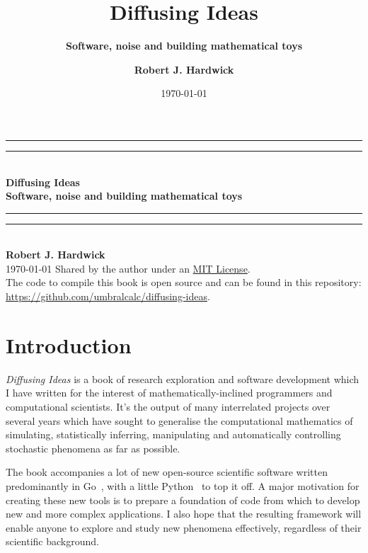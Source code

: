 \documentclass{book}
\title{\Huge \bfseries\sffamily Diffusing Ideas}
\subtitle{\Large \bfseries\sffamily \color{gray75} Software, noise and building mathematical toys}
\author{\bfseries\sffamily Robert J. Hardwick}
\date{\today}
\begin{document}
\begin{titlepage}
\centering
\vspace*{1.5\baselineskip}
{\color{gray75}\rule{13cm}{1.6pt}}\vspace*{-\baselineskip}\vspace*{2pt} %
{\color{gray75}\rule{13cm}{0.4pt}} \\ %
\vspace{1.0\baselineskip} %
{\Huge \bfseries\sffamily Diffusing Ideas} \\ 
\vspace{4mm}
{\Large \bfseries\sffamily \color{gray75} Software, noise and building mathematical toys \\}
\vspace{0.75\baselineskip}
{\color{gray75} \rule{13cm}{0.4pt}}\vspace*{-\baselineskip}\vspace{3.2pt} %
{\color{gray75} \rule{13cm}{1.6pt}} %
\vspace{1.75\baselineskip} \\
{\large \bfseries\sffamily Robert J. Hardwick \\
\vspace*{1.2\baselineskip}}
\today
\vfill
Shared by the author under an \href{https://opensource.org/licenses/MIT}{MIT License}.\\ \vspace{1mm}
The code to compile this book is open source and can be found in this repository: \url{https://github.com/umbralcalc/diffusing-ideas}.
\end{titlepage}


\chapter*{Introduction}

\emph{Diffusing Ideas} is a book of research exploration and software development which I have written for the interest of mathematically-inclined programmers and computational scientists. It's the output of many interrelated projects over several years which have sought to generalise the computational mathematics of simulating, statistically inferring, manipulating and automatically controlling stochastic phenomena as far as possible.

The book accompanies a lot of new open-source scientific software written predominantly in Go~\cite{golang}, with a little Python~\cite{pythonlang} to top it off. A major motivation for creating these new tools is to prepare a foundation of code from which to develop new and more complex applications. I also hope that the resulting framework will enable anyone to explore and study new phenomena effectively, regardless of their scientific background.
\end{document}

